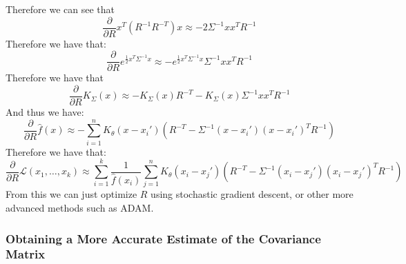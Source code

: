 \documentclass[10pt]{article}
\begin{document}
Therefore we can see that 
\begin{equation}
    \frac{\partial}{\partial R} x^T(R^{-1}R^{-T})x \approx -2\Sigma^{-1}xx^T R^{-1}
\end{equation}
Therefore we have that:
\begin{equation}
    \frac{\partial}{\partial R} e^{\frac{1}{2}x^T\Sigma^{-1}x} \approx -e^{\frac{1}{2}x^T\Sigma^{-1}x} \Sigma^{-1}xx^T R^{-1}
\end{equation}
Therefore we have that
\begin{equation}
    \frac{\partial}{\partial R} K_{\Sigma}(x) \approx -K_{\Sigma}(x)R^{-T} - K_{\Sigma}(x)\Sigma^{-1}xx^T R^{-1}
\end{equation}
And thus we have:
\begin{equation}
    \frac{\partial}{\partial R} \hat{f}(x) \approx -\sum_{i=1}^n K_{\theta}(x-x_i')\left(R^{-T} - \Sigma^{-1}(x-x_i')(x-x_i')^T R^{-1}\right)
\end{equation}
Therefore we have that:
\begin{equation}
    \frac{\partial}{\partial R}\mathcal{L}(x_1,\dots,x_k) \approx \sum_{i=1}^k \frac{1}{\hat{f}(x_i)} \sum_{j=1}^n K_{\theta}(x_i-x_j')\left(R^{-T} - \Sigma^{-1}(x_i-x_j')(x_i-x_j')^T R^{-1}\right)
\end{equation}
From this we can just optimize $R$ using stochastic gradient descent, or other more advanced methods such as ADAM.
\subsubsection{Obtaining a More Accurate Estimate of the Covariance Matrix}
\end{document}
